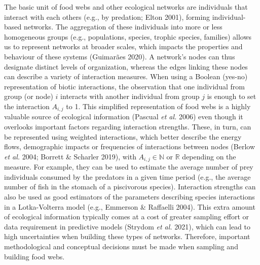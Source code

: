 \documentclass[10pt,oneside]{article}
\begin{document}
The basic unit of food webs and other ecological networks are
individuals that interact with each others (e.g., by predation; Elton
2001), forming individual-based networks. The aggregation of these
individuals into more or less homogeneous groups (e.g., populations,
species, trophic species, families) allows us to represent networks at
broader scales, which impacts the properties and behaviour of these
systems (Guimarães 2020). A network's nodes can thus designate distinct
levels of organization, whereas the edges linking these nodes can
describe a variety of interaction measures. When using a Boolean
(yes-no) representation of biotic interactions, the observation that one
individual from group (or node) \(i\) interacts with another individual
from group \(j\) is enough to set the interaction \(A_{i,j}\) to 1. This
simplified representation of food webs is a highly valuable source of
ecological information (Pascual \emph{et al.} 2006) even though it
overlooks important factors regarding interaction strengths. These, in
turn, can be represented using weighted interactions, which better
describe the energy flows, demographic impacts or frequencies of
interactions between nodes (Berlow \emph{et al.} 2004; Borrett \&
Scharler 2019), with \(A_{i,j} \in \mathbb{N}\) or \(\mathbb{R}\)
depending on the measure. For example, they can be used to estimate the
average number of prey individuals consumed by the predators in a given
time period (e.g., the average number of fish in the stomach of a
piscivorous species). Interaction strengths can also be used as good
estimators of the parameters describing species interactions in a
Lotka-Volterra model (e.g., Emmerson \& Raffaelli 2004). This extra
amount of ecological information typically comes at a cost of greater
sampling effort or data requirement in predictive models (Strydom
\emph{et al.} 2021), which can lead to high uncertainties when building
these types of networks. Therefore, important methodological and
conceptual decisions must be made when sampling and building food webs.
\end{document}
